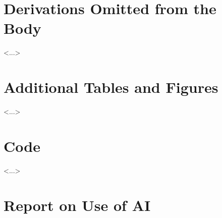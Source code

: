 \documentclass[12pt]{article}            %
\theoremstyle{definition}
\theoremstyle{remark}
\begin{document}
\appendix
\section{Derivations Omitted from the Body}
<...>

\section{Additional Tables and Figures}
<...>

\section{Code}
% 
<...>

%
%
\clearpage
{}             %
\section*{Report on Use of AI}
\end{document}
